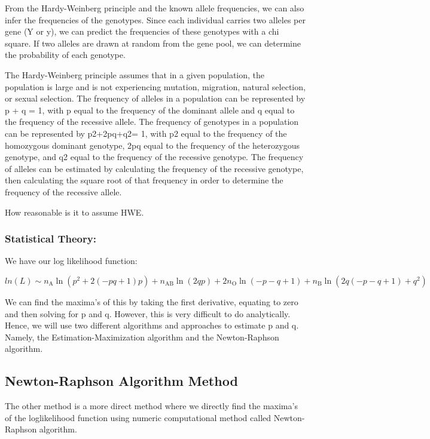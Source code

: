 \documentclass[]{article}
\begin{document}
From the Hardy-Weinberg principle and the known allele frequencies, we
can also infer the frequencies of the genotypes. Since each individual
carries two alleles per gene (Y or y), we can predict the frequencies of
these genotypes with a chi square. If two alleles are drawn at random
from the gene pool, we can determine the probability of each genotype.

The Hardy-Weinberg principle assumes that in a given population, the
population is large and is not experiencing mutation, migration, natural
selection, or sexual selection. The frequency of alleles in a population
can be represented by p + q = 1, with p equal to the frequency of the
dominant allele and q equal to the frequency of the recessive allele.
The frequency of genotypes in a population can be represented by
p2+2pq+q2= 1, with p2 equal to the frequency of the homozygous dominant
genotype, 2pq equal to the frequency of the heterozygous genotype, and
q2 equal to the frequency of the recessive genotype. The frequency of
alleles can be estimated by calculating the frequency of the recessive
genotype, then calculating the square root of that frequency in order to
determine the frequency of the recessive allele.

How reasonable is it to assume HWE.

\subsubsection{Statistical Theory:}\label{statistical-theory}

We have our log likelihood function:

\[ln(L) \sim n_\text{A}\ln\left(p^2+2\left(-p q+1\right)p\right)+n_\text{AB}\ln\left(2qp\right)+2n_\text{O}\ln\left(-p-q+1\right)+n_\text{B}\ln\left(2q\left(-p-q+1\right)+q^2\right)
\]

We can find the maxima's of this by taking the first derivative,
equating to zero and then solving for p and q. However, this is very
difficult to do analytically. Hence, we will use two different
algorithms and approaches to estimate p and q. Namely, the
Estimation-Maximization algorithm and the Newton-Raphson algorithm.

\subsection{Newton-Raphson Algorithm
Method}\label{newton-raphson-algorithm-method}

The other method is a more direct method where we directly find the
maxima's of the loglikelihood function using numeric computational
method called Newton-Raphson algorithm.
\end{document}

